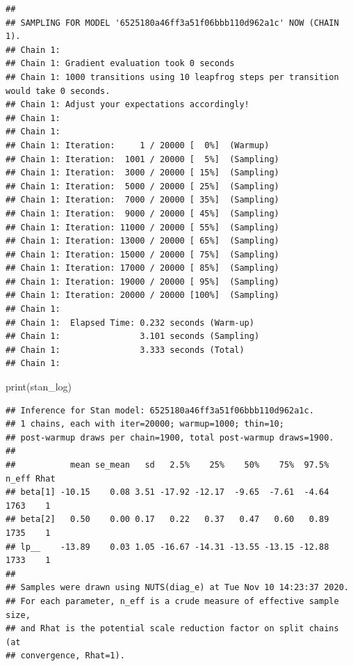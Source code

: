 \documentclass[
]{book}
\newenvironment{Shaded}{\begin{snugshade}}{\end{snugshade}}
\newcommand{\FunctionTok}[1]{\textcolor[rgb]{0.00,0.00,0.00}{#1}}
\newcommand{\NormalTok}[1]{#1}
\begin{document}
\begin{verbatim}
## 
## SAMPLING FOR MODEL '6525180a46ff3a51f06bbb110d962a1c' NOW (CHAIN 1).
## Chain 1: 
## Chain 1: Gradient evaluation took 0 seconds
## Chain 1: 1000 transitions using 10 leapfrog steps per transition would take 0 seconds.
## Chain 1: Adjust your expectations accordingly!
## Chain 1: 
## Chain 1: 
## Chain 1: Iteration:     1 / 20000 [  0%]  (Warmup)
## Chain 1: Iteration:  1001 / 20000 [  5%]  (Sampling)
## Chain 1: Iteration:  3000 / 20000 [ 15%]  (Sampling)
## Chain 1: Iteration:  5000 / 20000 [ 25%]  (Sampling)
## Chain 1: Iteration:  7000 / 20000 [ 35%]  (Sampling)
## Chain 1: Iteration:  9000 / 20000 [ 45%]  (Sampling)
## Chain 1: Iteration: 11000 / 20000 [ 55%]  (Sampling)
## Chain 1: Iteration: 13000 / 20000 [ 65%]  (Sampling)
## Chain 1: Iteration: 15000 / 20000 [ 75%]  (Sampling)
## Chain 1: Iteration: 17000 / 20000 [ 85%]  (Sampling)
## Chain 1: Iteration: 19000 / 20000 [ 95%]  (Sampling)
## Chain 1: Iteration: 20000 / 20000 [100%]  (Sampling)
## Chain 1: 
## Chain 1:  Elapsed Time: 0.232 seconds (Warm-up)
## Chain 1:                3.101 seconds (Sampling)
## Chain 1:                3.333 seconds (Total)
## Chain 1:
\end{verbatim}

\begin{Shaded}
\begin{Highlighting}[]
\FunctionTok{print}\NormalTok{(stan\_log)}
\end{Highlighting}
\end{Shaded}

\begin{verbatim}
## Inference for Stan model: 6525180a46ff3a51f06bbb110d962a1c.
## 1 chains, each with iter=20000; warmup=1000; thin=10; 
## post-warmup draws per chain=1900, total post-warmup draws=1900.
## 
##           mean se_mean   sd   2.5%    25%    50%    75%  97.5% n_eff Rhat
## beta[1] -10.15    0.08 3.51 -17.92 -12.17  -9.65  -7.61  -4.64  1763    1
## beta[2]   0.50    0.00 0.17   0.22   0.37   0.47   0.60   0.89  1735    1
## lp__    -13.89    0.03 1.05 -16.67 -14.31 -13.55 -13.15 -12.88  1733    1
## 
## Samples were drawn using NUTS(diag_e) at Tue Nov 10 14:23:37 2020.
## For each parameter, n_eff is a crude measure of effective sample size,
## and Rhat is the potential scale reduction factor on split chains (at 
## convergence, Rhat=1).
\end{verbatim}
\end{document}

